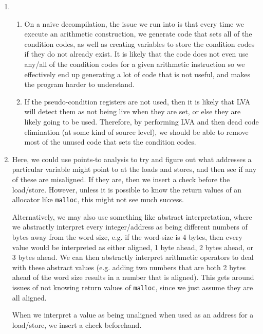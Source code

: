 


\begin{enumerate}[label=(\alph*)]
  \item
    \begin{enumerate}[label=(\roman*)]
      \item

        On a naive decompilation, the issue we run into is that every time we execute an arithmetic construction, we generate code that sets all of the condition codes, as well as creating variables to store the condition codes if they do not already exist. It is likely that the code does not even use any/all of the condition codes for a given arithmetic instruction so we effectively end up generating a lot of code that is not useful, and makes the program harder to understand.

      \item
        If the pseudo-condition registers are not used, then it is likely that LVA will detect them as not being live when they are set, or else they are likely going to be used. Therefore, by performing LVA and then dead code elimination (at some kind of source level), we should be able to remove most of the unused code that sets the condition codes.

    \end{enumerate}

  \item
    Here, we could use points-to analysis to try and figure out what addresses a particular variable might point to at the loads and stores, and then see if any of these are misaligned. If they are, then we insert a check before the load/store. However, unless it is possible to know the return values of an allocator like \texttt{malloc}, this might not see much success.

    Alternatively, we may also use something like abstract interpretation, where we abstractly interpret every integer/address as being different numbers of bytes away from the word size, e.g. if the word-size is 4 bytes, then every value would be interpreted as either aligned, 1 byte ahead, 2 bytes ahead, or 3 bytes ahead. We can then abstractly interpret arithmetic operators to deal with these abstract values (e.g. adding two numbers that are both 2 bytes ahead of the word size results in a number that is aligned). This gets around issues of not knowing return values of \texttt{malloc}, since we just assume they are all aligned.

    When we interpret a value as being unaligned when used as an address for a load/store, we insert a check beforehand.

        
\end{enumerate}

